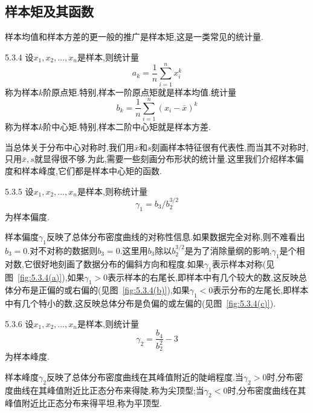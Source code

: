 \subsection{样本矩及其函数}
样本均值和样本方差的更一般的推广是样本矩,这是一类常见的统计量.
\begin{definition}{}{5.3.4}
设$x_1,x_2,\dotsc,x_n$是样本,则统计量
\begin{equation}\label{eq:5.3.9}
a_k=\frac1n\sum_{i=1}^nx_i^k
\end{equation}
称为样本$k$阶原点矩.特别,样本一阶原点矩就是样本均值.统计量
\begin{equation}\label{eq:5.3.10}
b_k=\frac1n\sum_{i=1}^n(x_i-\bar x)^k
\end{equation}
称为样本$k$阶中心矩.特别,样本二阶中心矩就是样本方差.
\end{definition}

当总体关于分布中心对称时,我们用$\bar x$和$s$刻画样本特征很有代表性,而当其不对称时,只用$\bar x,s$就显得很不够.为此,需要一些刻画分布形状的统计量.这里我们介绍样本偏度和样本峰度,它们都是样本中心矩的函数.
\begin{definition}{}{5.3.5}
设$x_1,x_2,\dotsc,x_n$是样本,则称统计量
\begin{equation}\label{eq:5.3.11}
\gamma_1=b_3/b_2^{3/2}
\end{equation}
为样本偏度.
\end{definition}
样本偏度$\gamma_1$反映了总体分布密度曲线的对称性信息.如果数据完全对称,则不难看出$b_3=0$.对不对称的数据则$b_3=0$.这里用$b_3$除以$b_2^{3/2}$是为了消除量纲的影响,$\gamma_1$是个相对数,它很好地刻画了数据分布的偏斜方向和程度.如果$\gamma_1$表示样本对称(见图~\ref{fig:5.3.4(a)}),如果$\gamma_1>0$表示样本的右尾长,即样本中有几个较大的数,这反映总体分布是正偏的或右偏的(见图~\ref{fig:5.3.4(b)}),如果$\gamma_1<0$表示分布的左尾长,即样本中有几个特小的数,这反映总体分布是负偏的或左偏的(见图~\ref{fig:5.3.4(c)}).
\begin{definition}{}{5.3.6}
设$x_1,x_2,\dotsc,x_n$是样本,则统计量
\begin{equation}\label{eq:5.3.12}
\gamma_2=\frac{b_4}{b_2^2}-3
\end{equation}
为样本峰度.
\end{definition}

样本峰度$\gamma_2$反映了总体分布密度曲线在其峰值附近的陡峭程度.当$\gamma_2>0$时,分布密度曲线在其峰值附近比正态分布来得陡,称为尖顶型;当$\gamma_2<0$时,分布密度曲线在其峰值附近比正态分布来得平坦,称为平顶型.
